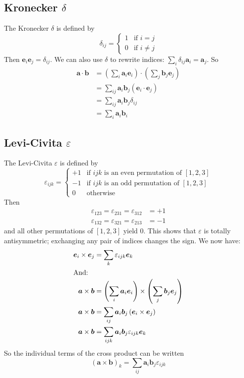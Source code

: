 \documentclass{article}
\begin{document}
	\subsection{Kronecker $\delta$}
	The Kronecker $\delta$ is defined by
	\[ \delta_{ij} = \begin{cases}
		1 & \text{if } i = j \\
		0 & \text{if } i \neq j
	\end{cases} \]
	Then $\bm e_i \bm e_j = \delta_{ij}$. We can also use $\delta$ to rewrite indices: $\sum_i \delta_{ij} \bm a_i = \bm a_j$. So
	\begin{align*}
		\bm a \cdot \bm b &= \left( \sum_i \bm a_i \bm e_i \right) \cdot \left( \sum_j \bm b_j \bm e_j \right) \\
		&= \sum_{ij} \bm a_i \bm b_j (\bm e_i \cdot \bm e_j) \\
		&= \sum_{ij} \bm a_i \bm b_j \delta_{ij} \\
		&= \sum_i \bm a_i \bm b_i
	\end{align*}

	\subsection{Levi-Civita $\varepsilon$}
	The Levi-Civita $\varepsilon$ is defined by
	\[
	\varepsilon_{ijk} = \begin{cases}
		+1 & \text{if } ijk \text{ is an even permutation of } [1, 2, 3] \\
		-1 & \text{if } ijk \text{ is an odd permutation of } [1, 2, 3] \\
		0 & \text{otherwise}
	\end{cases}
	\]
	Then
	\begin{align*}
		\varepsilon_{123} = \varepsilon_{231} = \varepsilon_{312} &= +1 \\
		\varepsilon_{132} = \varepsilon_{321} = \varepsilon_{213} &= -1
	\end{align*}
	and all other permutations of $[1, 2, 3]$ yield 0. This shows that $\varepsilon$ is totally antisymmetric; exchanging any pair of indices changes the sign. We now have:
	\begin{align*}
		\bm e_i \times \bm e_j &= \sum_k \varepsilon_{ijk} \bm e_k \\
	\intertext{And:}
		\bm a \times \bm b &= \left( \sum_i \bm a_i \bm e_i \right) \times \left( \sum_j \bm b_j \bm e_j \right) \\
		\bm a \times \bm b &= \sum_{ij} \bm a_i \bm b_j \left( \bm e_i \times \bm e_j \right) \\
		\bm a \times \bm b &= \sum_{ijk} \bm a_i \bm b_j \varepsilon_{ijk} \bm e_k
	\end{align*}
	So the individual terms of the cross product can be written
	\[ (\bm a \times \bm b)_k = \sum_{ij} \bm a_i \bm b_j \varepsilon_{ijk} \]
	
\end{document}
